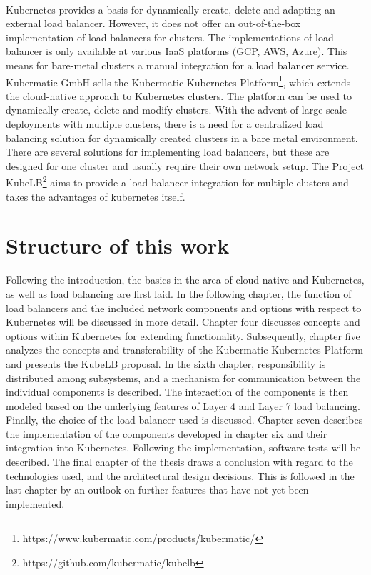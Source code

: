 \\
Kubernetes provides a basis for dynamically create, delete and adapting an external load balancer.
However, it does not offer an out-of-the-box implementation of load balancers for clusters.
The implementations of load balancer is only available at various IaaS platforms (GCP, AWS, Azure).
This means for bare-metal clusters a manual integration for a load balancer service.
\\
Kubermatic GmbH sells the Kubermatic Kubernetes Platform\footnote{https://www.kubermatic.com/products/kubermatic/}, which extends the cloud-native approach to Kubernetes clusters.
The platform can be used to dynamically create, delete and modify clusters.
With the advent of large scale deployments with multiple clusters, there is a need for a centralized load balancing solution for dynamically created clusters in a bare metal environment.
There are several solutions for implementing load balancers, but these are designed for one cluster and usually require their own network setup.
The Project KubeLB\footnote{https://github.com/kubermatic/kubelb} aims to provide a load balancer integration for multiple clusters and takes the advantages of kubernetes itself.

\section{Structure of this work}
Following the introduction, the basics in the area of cloud-native and Kubernetes, as well as load balancing are first laid.
In the following chapter, the function of load balancers and the included network components and options with respect to Kubernetes will be discussed in more detail.
Chapter four discusses concepts and options within Kubernetes for extending functionality.
Subsequently, chapter five analyzes the concepts and transferability of the Kubermatic Kubernetes Platform and presents the KubeLB proposal.
In the sixth chapter, responsibility is distributed among subsystems, and a mechanism for communication between the individual components is described.
The interaction of the components is then modeled based on the underlying features of Layer 4 and Layer 7 load balancing.
Finally, the choice of the load balancer used is discussed.
Chapter seven describes the implementation of the components developed in chapter six and their integration into Kubernetes.
Following the implementation, software tests will be described.
The final chapter of the thesis draws a conclusion with regard to the technologies used, and the architectural design decisions.
This is followed in the last chapter by an outlook on further features that have not yet been implemented.
